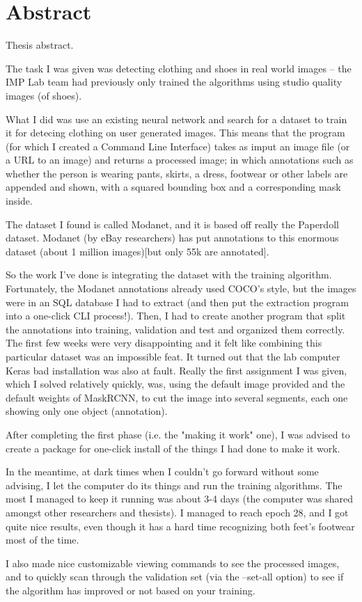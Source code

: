 \chapter*{Abstract}

Thesis abstract.

The task I was given was detecting clothing and shoes in real world images -- the IMP Lab team had previously only trained the algorithms using studio quality images (of shoes).

What I did was use an existing neural network and search for a dataset to train it for detecing clothing on user generated images. This means that the program (for which I created a Command Line Interface) takes as imput an image file (or a URL to an image) and returns a processed image; in which annotations such as whether the person is wearing pants, skirts, a dress, footwear or other labels are appended and shown, with a squared bounding box and a corresponding mask inside.

The dataset I found is called Modanet, and it is based off really the Paperdoll dataset. Modanet (by eBay researchers) has put annotations to this enormous dataset (about 1 million images)[but only 55k are annotated].

So the work I've done is integrating the dataset with the training algorithm. Fortunately, the Modanet annotations already used COCO's style, but the images were in an SQL database I had to extract (and then put the extraction program into a one-click CLI process!).
Then, I had to create another program that split the annotations into training, validation and test and organized them correctly. The first few weeks were very disappointing and it felt like combining this particular dataset was an impossible feat. It turned out that the lab computer Keras bad installation was also at fault.
Really the first assignment I was given, which I solved relatively quickly, was, using the default image provided and the default weights of MaskRCNN, to cut the image into several segments, each one showing only one object (annotation).

After completing the first phase (i.e. the "making it work" one), I was advised to create a package for one-click install of the things I had done to make it work.

In the meantime, at dark times when I couldn't go forward without some advising, I let the computer do its things and run the training algorithms. The most I managed to keep it running was about 3-4 days (the computer was shared amongst other researchers and thesists). I managed to reach epoch 28, and I got quite nice results, even though it has a hard time recognizing both feet's footwear most of the time. 

I also made nice customizable viewing commands to see the processed images, and to quickly scan through the validation set (via the --set-all option) to see if the algorithm has improved or not based on your training.